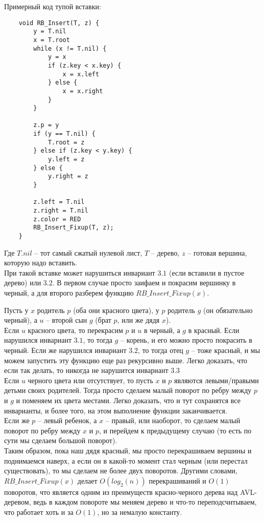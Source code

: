 Примерный код тупой вставки: \\

\begin{lstlisting}
    void RB_Insert(T, z) {
        y = T.nil
        x = T.root
        while (x != T.nil) {
            y = x
            if (z.key < x.key) {
                x = x.left
            } else {
                x = x.right
            }
        }

        z.p = y
        if (y == T.nil) {
            T.root = z
        } else if (z.key < y.key) {
            y.left = z
        } else {
            y.right = z
        }

        z.left = T.nil
        z.right = T.nil
        z.color = RED
        RB_Insert_Fixup(T, z);
    }
\end{lstlisting}

Где $T.nil$ -- тот самый сжатый нулевой лист, $T$ -- дерево, $z$ -- готовая вершина, которую надо вставить. \\
При такой вставке может нарушиться инвариант $3.1$ (если вставили в пустое дерево) или $3.2$. В первом случае просто заифаем и покрасим вершинку в черный, а для второго разберем функцию $RB\_Insert\_Fixup(x)$. 

Пусть у $x$ родитель $p$ (оба они красного цвета), у $p$ родитель $g$ (он обязательно черный), а $u$ -- второй сын $g$ (брат $p$, или же дядя $x$). \\
Если $u$ красного цвета, то перекрасим $p$ и $u$ в черный, а $g$ в красный. Если нарушился инвариант $3.1$, то тогда $g$ -- корень, и его можно просто покрасить в черный. Если же нарушился инвариант $3.2$, то тогда отец $g$ -- тоже красный, и мы можем запустить эту функцию еще раз рекурсивно выше. Легко доказать, что если так делать, то никогда не нарушится инвариант $3.3$ \\ 
Если $u$ черного цвета или отсутствует, то пусть $x$ и $p$ являются левыми/правыми детьми своих родителей. Тогда просто сделаем малый поворот по ребру между $p$ и $g$ и поменяем их цвета местами. Легко доказать, что и тут сохранятся все инварианты, и более того, на этом выполнение функции заканчивается. \\
Если же $p$ -- левый ребенок, а $x$ -- правый, или наоборот, то сделаем малый поворот по ребру между $x$ и $p$, и перейдем к предыдущему случаю (то есть по сути мы сделаем большой поворот). \\
Таким образом, пока наш дядя красный, мы просто перекрашиваем вершины и поднимаемся наверх, а если он в какой-то момент стал черным (или перестал существовать), то мы сделаем не более двух поворотов. Другими словами, $RB\_Insert\_Fixup(x)$ делает $O(log_2(n))$ перекрашиваний и $O(1)$ поворотов, что является одним из преимуществ красно-черного дерева над AVL-деревом, ведь в каждом повороте мы меняем дерево и что-то переподсчитываем, что работает хоть и за $O(1)$, но за немалую константу.

